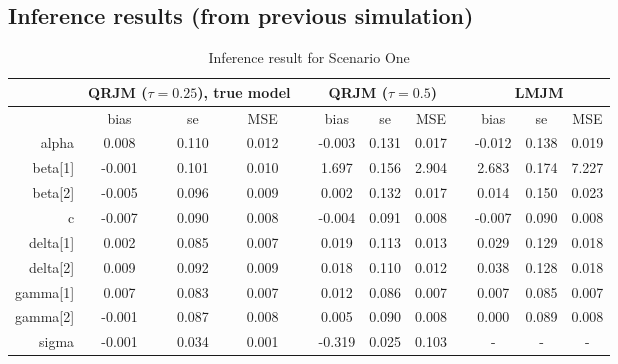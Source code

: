 \documentclass{article}
\begin{document}
\subsection{Inference results (from previous simulation)}
\begin{table}[H]
\centering
\caption{Inference result for Scenario One}
\begin{tabular}{rccccccccccc}
\hline
& \multicolumn{3}{c}{QRJM ($\tau=0.25$), true model} & &\multicolumn{3}{c}{QRJM ($\tau=0.5$)} & & \multicolumn{3}{c}{LMJM}\\
\hline
 & bias & se & MSE & & bias & se & MSE & & bias & se & MSE \\
 \cline{2-4}  \cline{6-8}  \cline{10-12}
  alpha & 0.008 & 0.110 & 0.012 & & -0.003 & 0.131 & 0.017 & & -0.012 & 0.138 & 0.019 \\
  beta[1] & -0.001 & 0.101 & 0.010 & & 1.697 & 0.156 & 2.904 & & 2.683 & 0.174 & 7.227 \\
  beta[2] & -0.005 & 0.096 & 0.009 & & 0.002 & 0.132 & 0.017 & & 0.014 & 0.150 & 0.023 \\
  c & -0.007 & 0.090 & 0.008 & & -0.004 & 0.091 & 0.008 & & -0.007 & 0.090 & 0.008 \\
  delta[1] & 0.002 & 0.085 & 0.007 & & 0.019 & 0.113 & 0.013 & & 0.029 & 0.129 & 0.018 \\
  delta[2] & 0.009 & 0.092 & 0.009 & & 0.018 & 0.110 & 0.012 & & 0.038 & 0.128 & 0.018 \\
  gamma[1] & 0.007 & 0.083 & 0.007 & & 0.012 & 0.086 & 0.007 & & 0.007 & 0.085 & 0.007 \\
  gamma[2] & -0.001 & 0.087 & 0.008 & & 0.005 & 0.090 & 0.008 & & 0.000 & 0.089 &  0.008 \\
  sigma & -0.001 & 0.034 & 0.001 & & -0.319 & 0.025 & 0.103 & & - & - & - \\
   \hline
\end{tabular}
\end{table}
\end{document}
